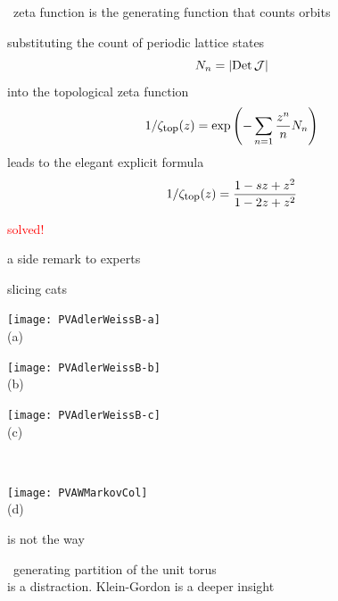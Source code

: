 \begin{frame}{\templatt\  zeta function}
is the generating function that counts {\color{blue}orbits}
\medskip

substituting the {\color{blue}\HillDet} count of periodic lattice states
\[
N_n=|\mbox{\rm Det}\,{\cal J}|
\]
into the
{topological} zeta func\-tion
\[
1/\zeta_{\mbox{\footnotesize top}} (z)
  =   \exp \left(
    -\sum_{n=1} \frac{z^n}{n} N_n
    \right)
\]%
leads to the elegant explicit formula
\[
1/\zeta_{\mbox{\footnotesize top}} (z)
 =  \frac{1 - s z + z^2}
         {1 - 2 z + z^2}
\]%


\vfill\hfill
{\Huge \textcolor{red}{solved!}}
\end{frame} %

\begin{frame}{a side remark to experts}
    \begin{block}{slicing cats}
\begin{center}
            \begin{minipage}[c]{0.23\textwidth}\begin{center}
\texttt{[image: PVAdlerWeissB-a]}\\(a)
            \end{center}\end{minipage}
            \begin{minipage}[c]{0.23\textwidth}\begin{center}
\texttt{[image: PVAdlerWeissB-b]}\\(b)
            \end{center}\end{minipage}
            \begin{minipage}[c]{0.23\textwidth}\begin{center}
\texttt{[image: PVAdlerWeissB-c]}\\(c)
            \end{center}\end{minipage}
            ~~~
            \begin{minipage}[c]{0.12\textwidth}\begin{center}
\texttt{[image: PVAWMarkovCol]}\\(d)
            \end{center}\end{minipage}
\end{center}

 is not the way
    \end{block}

\AW\ generating partition of the unit torus\\
is a distraction. Klein-Gordon is a deeper insight
\end{frame} %


